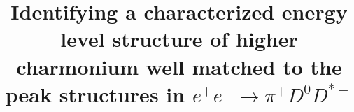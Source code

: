 \documentclass[final,5p,times,twocolumn]{elsarticle}
\begin{document}
\begin{frontmatter}



\title{Identifying a characterized energy level structure of higher charmonium well matched to the peak structures in $e^+e^-\to \pi^+ D^0 D^{*-}$}

\end{frontmatter}
\end{document}
